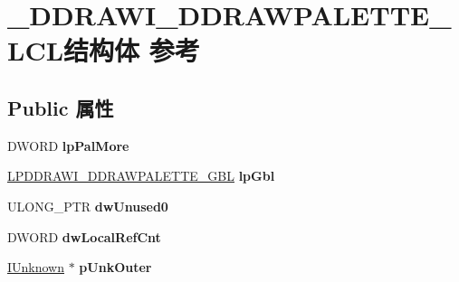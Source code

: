 \hypertarget{struct___d_d_r_a_w_i___d_d_r_a_w_p_a_l_e_t_t_e___l_c_l}{}\section{\+\_\+\+D\+D\+R\+A\+W\+I\+\_\+\+D\+D\+R\+A\+W\+P\+A\+L\+E\+T\+T\+E\+\_\+\+L\+C\+L结构体 参考}
\label{struct___d_d_r_a_w_i___d_d_r_a_w_p_a_l_e_t_t_e___l_c_l}
\subsection*{Public 属性}
\begin{DoxyCompactItemize}
\item 
\mbox{\label{struct___d_d_r_a_w_i___d_d_r_a_w_p_a_l_e_t_t_e___l_c_l_a52e021b46ac7fe81540666bf737fcdf9}} 
D\+W\+O\+RD {\bfseries lp\+Pal\+More}
\item 
\mbox{\label{struct___d_d_r_a_w_i___d_d_r_a_w_p_a_l_e_t_t_e___l_c_l_aa772e4da7c454fd202d3dd83347263cd}} 
\hyperlink{struct___d_d_r_a_w_i___d_d_r_a_w_p_a_l_e_t_t_e___g_b_l}{L\+P\+D\+D\+R\+A\+W\+I\+\_\+\+D\+D\+R\+A\+W\+P\+A\+L\+E\+T\+T\+E\+\_\+\+G\+BL} {\bfseries lp\+Gbl}
\item 
\mbox{\label{struct___d_d_r_a_w_i___d_d_r_a_w_p_a_l_e_t_t_e___l_c_l_ae49c204550cbd2bb39a7a1debf565846}} 
U\+L\+O\+N\+G\+\_\+\+P\+TR {\bfseries dw\+Unused0}
\item 
\mbox{\label{struct___d_d_r_a_w_i___d_d_r_a_w_p_a_l_e_t_t_e___l_c_l_ad1d26ac52582bf31c72e89f23eec34e5}} 
D\+W\+O\+RD {\bfseries dw\+Local\+Ref\+Cnt}
\item 
\mbox{\label{struct___d_d_r_a_w_i___d_d_r_a_w_p_a_l_e_t_t_e___l_c_l_a575330cd64a97c86862ca08c0eb4e7e5}} 
\hyperlink{interface_i_unknown}{I\+Unknown} $\ast$ {\bfseries p\+Unk\+Outer}
\item 
\mbox{\label{struct___d_d_r_a_w_i___d_d_r_a_w_p_a_l_e_t_t_e___l_c_l_af35c16f0965c2ec44ad9f4fe62c22116}} 

\end{DoxyCompactItemize}
